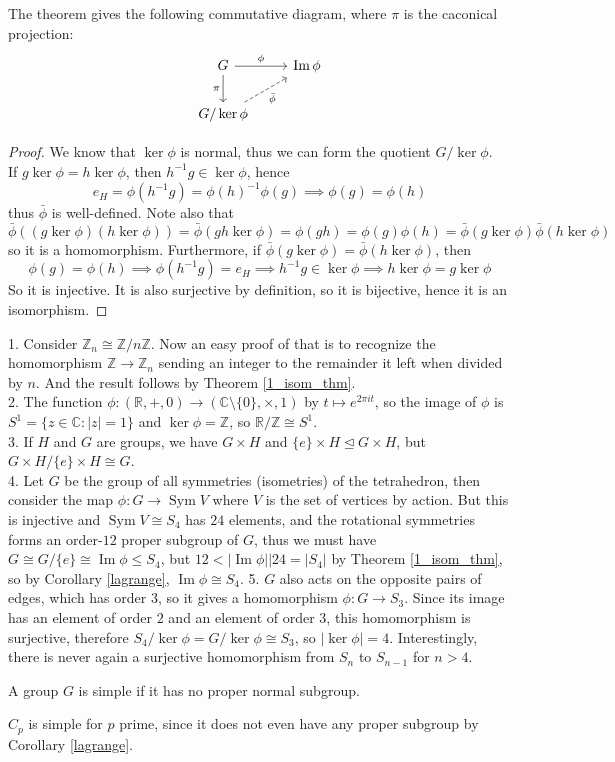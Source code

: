 The theorem gives the following commutative diagram, where $\pi$ is the caconical projection:
$$
\begin{tikzcd}
    G\arrow{r}{\phi} \arrow[swap]{d}{\pi} & \operatorname{Im}\phi\\
    G/\ker\phi\arrow[swap,dashed]{ur}{\bar\phi}&
\end{tikzcd}
$$
\begin{proof}
    We know that $\ker\phi$ is normal, thus we can form the quotient $G/\ker\phi$.\\
    If $g\ker\phi=h\ker\phi$, then $h^{-1}g\in\ker\phi$, hence
    $$e_H=\phi(h^{-1}g)=\phi(h)^{-1}\phi(g)\implies \phi(g)=\phi(h)$$
    thus $\bar\phi$ is well-defined.
    Note also that
    $$\bar\phi((g\ker\phi)(h\ker\phi))=\bar\phi(gh\ker\phi)=\phi(gh)=\phi(g)\phi(h)=\bar\phi(g\ker\phi)\bar\phi(h\ker\phi)$$
    so it is a homomorphism.
    Furthermore, if $\bar\phi(g\ker\phi)=\bar\phi(h\ker\phi)$, then
    $$\phi(g)=\phi(h)\implies \phi(h^{-1}g)=e_H\implies h^{-1}g\in\ker\phi\implies h\ker\phi=g\ker\phi$$
    So it is injective.
    It is also surjective by definition, so it is bijective, hence it is an isomorphism.
\end{proof}
\begin{example}
    1. Consider $\mathbb Z_n\cong\mathbb Z/n\mathbb Z$.
    Now an easy proof of that is to recognize the homomorphism $\mathbb Z\to\mathbb Z_n$ sending an integer to the remainder it left when divided by $n$.
    And the result follows by Theorem \ref{1_isom_thm}.\\
    2. The function $\phi:(\mathbb R,+,0)\to(\mathbb C\setminus\{0\},\times,1)$ by $t\mapsto e^{2\pi it}$, so the image of $\phi$ is $S^1=\{z\in\mathbb C:|z|=1\}$ and $\ker\phi=\mathbb Z$, so $\mathbb R/\mathbb Z\cong S^1$.\\
    3. If $H$ and $G$ are groups, we have $G\times H$ and $\{e\}\times H\unlhd G\times H$, but $G\times H/\{e\}\times H\cong G$.\\
    4. Let $G$ be the group of all symmetries (isometries) of the tetrahedron, then consider the map $\phi:G\to\operatorname{Sym} V$ where $V$ is the set of vertices by action.
    But this is injective and $\operatorname{Sym}V\cong S_4$ has $24$ elements, and the rotational symmetries forms an order-$12$ proper subgroup of $G$, thus we must have $G\cong G/\{e\}\cong\operatorname{Im}\phi\le S_4$, but $12<|\operatorname{Im}\phi||24=|S_4|$ by Theorem \ref{1_isom_thm}, so by Corollary \ref{lagrange}, $\operatorname{Im}\phi\cong S_4$.
    5. $G$ also acts on the opposite pairs of edges, which has order $3$, so it gives a homomorphism $\phi:G\to S_3$.
    Since its image has an element of order $2$ and an element of order $3$, this homomorphism is surjective, therefore $S_4/\ker\phi=G/\ker\phi\cong S_3$, so $|\ker\phi|=4$.
    Interestingly, there is never again a surjective homomorphism from $S_n$ to $S_{n-1}$ for $n>4$.
\end{example}
\begin{definition}
    A group $G$ is simple if it has no proper normal subgroup.
\end{definition}
\begin{example}
    $C_p$ is simple for $p$ prime, since it does not even have any proper subgroup by Corollary \ref{lagrange}.
\end{example}
